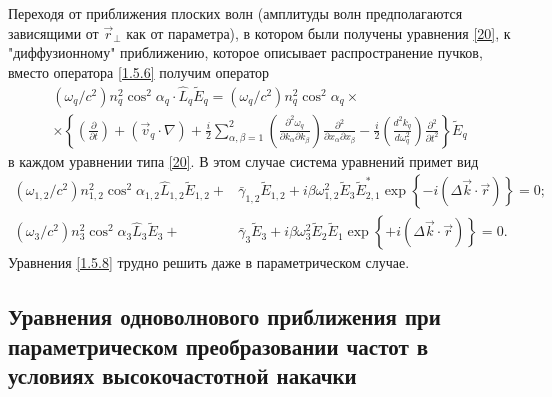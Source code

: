 \documentclass[a4paper]{article}
\begin{document}
Переходя от приближения плоских волн (амплитуды волн предполагаются зависящими от  $\vec{r}_{\perp}$   как от параметра), в котором были получены уравнения \eqref{20}, к "диффузионному" приближению, которое описывает распространение пучков, вместо оператора \eqref{1.5.6} получим оператор 
\begin{multline}
	\left(\omega_{q}/c^{2}\right)n_{q}^{2}\cos^{2}\alpha_{q}\cdot\hat{L}_{q}\tilde{E}_{q}=\left(\omega_{q}/c^{2}\right)n_{q}^{2}\cos^{2}\alpha_{q}\times\\
	\times\left\{\left(\frac{\partial}{\partial t}\right)+\left(\vec{v}_{q}\cdot\nabla\right)+\frac{i}{2}\sum_{\alpha,\beta=1}^{2}\left(\frac{\partial^{2}\omega_{q}}{\partial k_{\alpha}\partial k_{\beta}}\right)\frac{\partial^{2}}{\partial x_{\alpha}\partial x_{\beta}}-\frac{i}{2}\left(\frac{d^{2}k_{q}}{d\omega_{q}^{2}}\right)\frac{\partial^{2}}{\partial t^{2}}\right\}\tilde{E}_{q}
	\label{1.5.7}
\end{multline}
в каждом уравнении типа \eqref{20}. В этом случае система уравнений примет вид 
\begin{equation}
	\begin{split}
		\left(\omega_{1,2}/c^{2}\right)n_{1,2}^{2}\cos^{2}\alpha_{1,2}\hat{L}_{1,2}\tilde{E}_{1,2}+&\bar{\gamma}_{1,2}\tilde{E}_{1,2}+i\beta\omega_{1,2}^{2}\tilde{E}_{3}\tilde{E}_{2,1}^{*}\exp\left\{-i\left(\Delta\vec{k}\cdot\vec{r}\right)\right\}=0;\\
		\left(\omega_{3}/c^{2}\right)n_{3}^{2}\cos^{2}\alpha_{3}\hat{L}_{3}\tilde{E}_{3}+&\bar{\gamma}_{3}\tilde{E}_{3}+i\beta\omega_{3}^{2}\tilde{E}_{2}\tilde{E}_{1}\exp\left\{+i\left(\Delta\vec{k}\cdot\vec{r}\right)\right\}=0.
	\end{split}
	\label{1.5.8}
\end{equation}
Уравнения \eqref{1.5.8} трудно решить даже в параметрическом случае.
\subsection{Уравнения одноволнового приближения при параметрическом преобразовании частот в условиях высокочастотной накачки}
\end{document}
